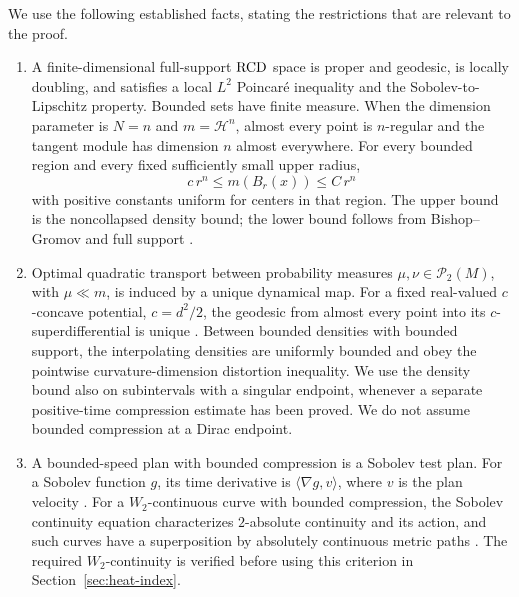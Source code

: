 We use the following established facts, stating the restrictions
that are relevant to the proof.

\begin{enumerate}
\item A finite-dimensional full-support \(\mathrm{RCD}\) space is proper
and geodesic, is locally doubling, and satisfies a local
\(L^2\) Poincar\'e inequality and the Sobolev-to-Lipschitz property.
Bounded sets have finite measure. When the dimension parameter is
\(N=n\) and \(m=\mathcal H^n\), almost every point is \(n\)-regular and the
tangent module has dimension \(n\) almost everywhere. For every
bounded region and every fixed sufficiently small upper radius,
\begin{equation}
\label{eq:local-volume}
c\,r^n\le m(B_r(x))\le C\,r^n
\end{equation}
with positive constants uniform for centers in that region.
The upper bound is the noncollapsed density bound; the lower bound
follows from Bishop--Gromov and full support
\cite[Theorem~1.12 and Corollary~2.14]{DPG2018}.

\item Optimal quadratic transport between probability measures
\(\mu,\nu\in\mathcal P_2(M)\), with \(\mu\ll m\), is induced by
a unique dynamical map.
For a fixed real-valued \(c\)-concave potential, \(c=d^2/2\), the geodesic
from almost every point into its \(c\)-superdifferential is unique
\cite[Theorems~1.1 and 1.3]{GigliRajalaSturm2016}.
Between bounded densities with bounded support, the interpolating
densities are uniformly bounded and obey the pointwise
curvature-dimension distortion inequality.
We use the density bound also on subintervals with a singular
endpoint, whenever a separate positive-time compression estimate
has been proved. We do not assume bounded compression at a Dirac
endpoint.

\item A bounded-speed plan with bounded compression is a
Sobolev test plan. For a Sobolev function \(g\), its time
derivative is \(\langle\nabla g,v\rangle\), where \(v\) is the
plan velocity \cite[Theorem/Definition~2.33]{GigliDifferentialStructure}.
For a \(W_2\)-continuous curve with bounded compression, the
Sobolev continuity equation characterizes \(2\)-absolute
continuity and its action, and such curves have a superposition
by absolutely continuous metric paths
\cite[Theorem~3.5 and Proposition~2.1]{GigliHan2015}.
The required \(W_2\)-continuity is verified before using this
criterion in Section~\ref{sec:heat-index}.


\end{enumerate}
